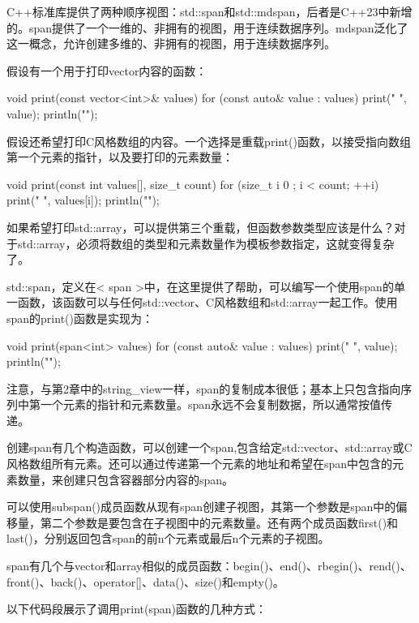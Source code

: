 
C++标准库提供了两种顺序视图：std::span和std::mdspan，后者是C++23中新增的。span提供了一个一维的、非拥有的视图，用于连续数据序列。mdspan泛化了这一概念，允许创建多维的、非拥有的视图，用于连续数据序列。


假设有一个用于打印vector内容的函数：

\begin{cpp}
void print(const vector<int>& values)
{
    for (const auto& value : values) { print("{} ", value); }
    println("");
}
\end{cpp}

假设还希望打印C风格数组的内容。一个选择是重载print()函数，以接受指向数组第一个元素的指针，以及要打印的元素数量：

\begin{cpp}
void print(const int values[], size_t count)
{
    for (size_t i { 0 }; i < count; ++i) { print("{} ", values[i]); }
    println("");
}
\end{cpp}

如果希望打印std::array，可以提供第三个重载，但函数参数类型应该是什么？对于std::array，必须将数组的类型和元素数量作为模板参数指定，这就变得复杂了。

std::span，定义在< span >中，在这里提供了帮助，可以编写一个使用span的单一函数，该函数可以与任何std::vector、C风格数组和std::array一起工作。使用span的print()函数是实现为：

\begin{cpp}
void print(span<int> values)
{
    for (const auto& value : values) { print("{} ", value); }
    println("");
}
\end{cpp}

注意，与第2章中的string\_view一样，span的复制成本很低；基本上只包含指向序列中第一个元素的指针和元素数量。span永远不会复制数据，所以通常按值传递。

创建span有几个构造函数，可以创建一个span,包含给定std::vector、std::array或C风格数组所有元素。还可以通过传递第一个元素的地址和希望在span中包含的元素数量，来创建只包含容器部分内容的span。

可以使用subspan()成员函数从现有span创建子视图，其第一个参数是span中的偏移量，第二个参数是要包含在子视图中的元素数量。还有两个成员函数first()和last()，分别返回包含span的前n个元素或最后n个元素的子视图。

span有几个与vector和array相似的成员函数：begin()、end()、rbegin()、rend()、front()、back()、operator[]、data()、size()和empty()。

以下代码段展示了调用print(span)函数的几种方式：

